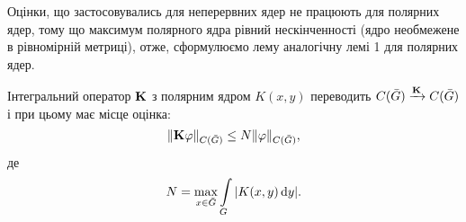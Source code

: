 Оцінки, що застосовувались для неперервних ядер не працюють для полярних ядер, тому що максимум полярного ядра рівний нескінченності (ядро необмежене в рівномірній метриці), отже, сформулюємо лему аналогічну лемі 1 для полярних ядер. 
\begin{lemma}
	Інтегральний оператор $\bf{K}$ з полярним ядром $K(x, y)$ переводить $C(\bar G) \xrightarrow{\bf{K}} C (\bar G)$ і при цьому має місце оцінка: 
	\begin{equation}
		\label{eq:1.21}
		\| \bf{K} \phi \|_{C(\bar G)} \le N \| \phi\|_{C(\bar G)},
	\end{equation}
	де 
	\begin{equation}
		\label{eq:1.22}
		N = \Max_{x \in \bar G} \Int_G |K(x, y) \diff y|.
	\end{equation}
\end{lemma}
